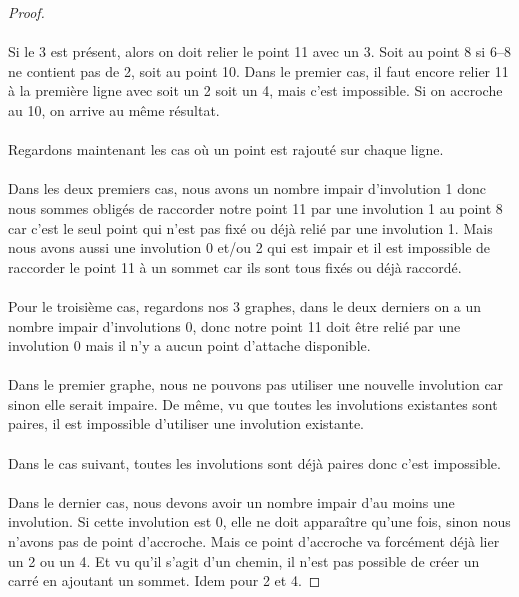\begin{proof}
  \paragraph{}
  Si le 3 est présent, alors on doit relier le point 11 avec un 3. Soit au point 8 si 6--8 ne contient pas de 2, soit au point 10. Dans le premier cas, il faut encore relier 11 à la première ligne avec soit un 2 soit un 4, mais c'est impossible. Si on accroche au 10, on arrive au même résultat.


  \paragraph{}
  Regardons maintenant les cas où un point est rajouté sur chaque ligne.

  \paragraph{}
  Dans les deux premiers cas, nous avons un nombre impair d'involution 1 donc nous sommes obligés de raccorder notre point 11 par une involution 1 au point 8 car c'est le seul point qui n'est pas fixé ou déjà relié par une involution 1. Mais nous avons aussi une involution 0 et/ou 2 qui est impair et il est impossible de raccorder le point 11 à un sommet car ils sont tous fixés ou déjà raccordé.

  \paragraph{}
  Pour le troisième cas, regardons nos 3 graphes, dans le deux derniers on a un nombre impair d'involutions 0, donc notre point 11 doit être relié par une involution 0 mais il n'y a aucun point d'attache disponible.

  \paragraph{}
  Dans le premier graphe, nous ne pouvons pas utiliser une nouvelle involution car sinon elle serait impaire. De même, vu que toutes les involutions existantes sont paires, il est impossible d'utiliser une involution existante.

  \paragraph{}
  Dans le cas suivant, toutes les involutions sont déjà paires donc c'est impossible.

  \paragraph{}
  Dans le dernier cas, nous devons avoir un nombre impair d'au moins une involution. Si cette involution est 0, elle ne doit apparaître qu'une fois, sinon nous n'avons pas de point d'accroche. Mais ce point d'accroche va forcément déjà lier un 2 ou un 4. Et vu qu'il s'agit d'un chemin, il n'est pas possible de créer un carré en ajoutant un sommet. Idem pour 2 et 4.


\end{proof}
